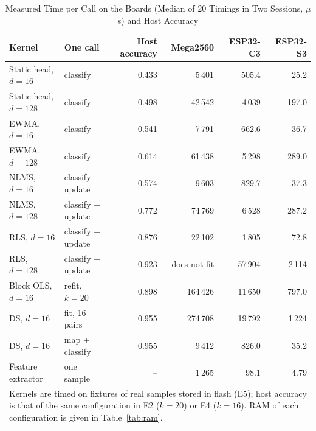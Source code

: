 \begin{table}[!t]
\caption{Measured Time per Call on the Boards (Median of 20 Timings in Two Sessions, $\mu$s) and Host Accuracy}
\label{tab:mcu}\centering\footnotesize
\begin{tabular}{l l r rrr}\toprule
Kernel & One call & Host accuracy & Mega2560 & ESP32-C3 & ESP32-S3\\\midrule
Static head, $d=16$ & classify & 0.433 & 5\,401 & 505.4 & 25.2\\
Static head, $d=128$ & classify & 0.498 & 42\,542 & 4\,039 & 197.0\\
EWMA, $d=16$ & classify & 0.541 & 7\,791 & 662.6 & 36.7\\
EWMA, $d=128$ & classify & 0.614 & 61\,438 & 5\,298 & 289.0\\
NLMS, $d=16$ & classify + update & 0.574 & 9\,603 & 829.7 & 37.3\\
NLMS, $d=128$ & classify + update & 0.772 & 74\,769 & 6\,528 & 287.2\\
RLS, $d=16$ & classify + update & 0.876 & 22\,102 & 1\,805 & 72.8\\
RLS, $d=128$ & classify + update & 0.923 & does not fit & 57\,904 & 2\,114\\
Block OLS, $d=16$ & refit, $k=20$ & 0.898 & 164\,426 & 11\,650 & 797.0\\
DS, $d=16$ & fit, 16 pairs & 0.955 & 274\,708 & 19\,792 & 1\,224\\
DS, $d=16$ & map + classify & 0.955 & 9\,412 & 826.0 & 35.2\\
Feature extractor & one sample & -- & 1\,265 & 98.1 & 4.79\\
\bottomrule
\multicolumn{6}{p{0.62\textwidth}}{\scriptsize Kernels are timed on fixtures of real samples stored in flash (E5); host accuracy is that of the same configuration in E2 ($k=20$) or E4 ($k=16$). RAM of each configuration is given in Table~\ref{tab:ram}.}
\end{tabular}
\end{table}
